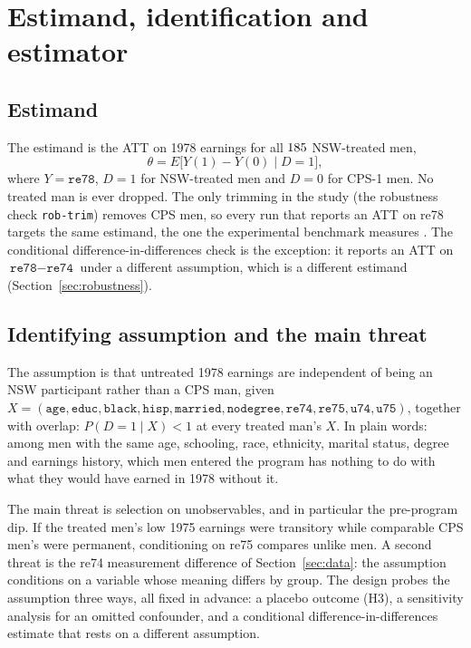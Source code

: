 \documentclass[11pt]{article}
\newcommand{\var}[1]{\texttt{#1}}
\newcommand{\run}[1]{\texttt{#1}}
\begin{document}
\section{Estimand, identification and estimator}
\label{sec:strategy}

\subsection{Estimand}

The estimand is the ATT on 1978 earnings for all $185$ NSW-treated men,
\[
  \theta = E\bigl[Y(1) - Y(0) \mid D = 1\bigr],
\]
where $Y = \var{re78}$, $D = 1$ for NSW-treated men and $D = 0$ for CPS-1 men. No treated man
is ever dropped. The only trimming in the study (the robustness check \run{rob-trim}) removes
CPS men, so every run that reports an ATT on re78 targets the same estimand, the one the
experimental benchmark measures \citep{dehejia1999,imbens2025}. The conditional
difference-in-differences check is the exception: it reports an ATT on $\var{re78} -
\var{re74}$ under a different assumption, which is a different estimand
(Section~\ref{sec:robustness}).

\subsection{Identifying assumption and the main threat}

The assumption is that untreated 1978 earnings are independent of being an NSW participant
rather than a CPS man, given $X = (\var{age}, \var{educ}, \var{black}, \var{hisp},
\var{married}, \var{nodegree}, \var{re74}, \var{re75}, \var{u74}, \var{u75})$, together with
overlap: $P(D = 1 \mid X) < 1$ at every treated man's $X$. In plain words: among men with the
same age, schooling, race, ethnicity, marital status, degree and earnings history, which men
entered the program has nothing to do with what they would have earned in 1978 without it.

The main threat is selection on unobservables, and in particular the pre-program dip. If
the treated men's low 1975 earnings were transitory while comparable CPS men's were
permanent, conditioning on re75 compares unlike men. A second threat is the re74
measurement difference of Section~\ref{sec:data}: the assumption conditions on a variable
whose meaning differs by group. The design probes the assumption three ways, all fixed in
advance: a placebo outcome (H3), a sensitivity analysis for an omitted confounder, and a
conditional difference-in-differences estimate that rests on a different assumption.
\end{document}
